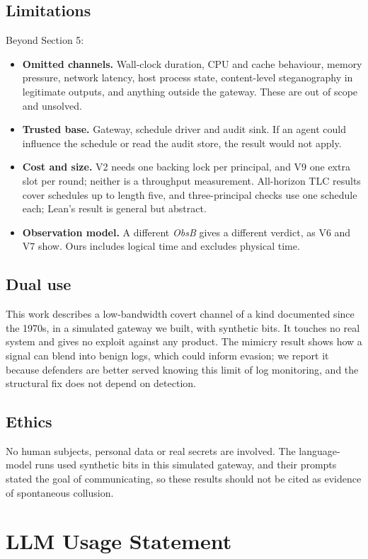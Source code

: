 \documentclass[11pt,letterpaper]{article}
\begin{document}
\subsection{Limitations}
Beyond Section 5:
\begin{itemize}
  \item \textbf{Omitted channels.} Wall-clock duration, CPU and cache behaviour, memory pressure, network latency, host process state, content-level steganography in legitimate outputs, and anything outside the gateway. These are out of scope and unsolved.
  \item \textbf{Trusted base.} Gateway, schedule driver and audit sink. If an agent could influence the schedule or read the audit store, the result would not apply.
  \item \textbf{Cost and size.} V2 needs one backing lock per principal, and V9 one extra slot per round; neither is a throughput measurement. All-horizon TLC results cover schedules up to length five, and three-principal checks use one schedule each; Lean's result is general but abstract.
  \item \textbf{Observation model.} A different \emph{ObsB} gives a different verdict, as V6 and V7 show. Ours includes logical time and excludes physical time.
\end{itemize}

\subsection{Dual use}
This work describes a low-bandwidth covert channel of a kind documented since the 1970s, in a simulated gateway we built, with synthetic bits. It touches no real system and gives no exploit against any product. The mimicry result shows how a signal can blend into benign logs, which could inform evasion; we report it because defenders are better served knowing this limit of log monitoring, and the structural fix does not depend on detection.

\subsection{Ethics}
No human subjects, personal data or real secrets are involved. The language-model runs used synthetic bits in this simulated gateway, and their prompts stated the goal of communicating, so these results should not be cited as evidence of spontaneous collusion.

\section{LLM Usage Statement}
\end{document}
